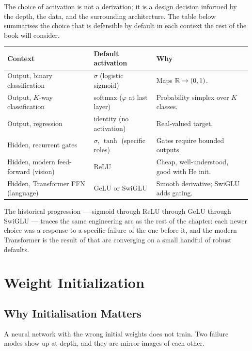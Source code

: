 The choice of activation is not a derivation; it is a design
decision informed by the depth, the data, and the surrounding
architecture. The table below summarises the choice that is
defensible by default in each context the rest of the book will
consider.

\begin{center}
\begin{tabular}{|l|l|l|}
\hline
\textbf{Context} & \textbf{Default activation} & \textbf{Why} \\
\hline
Output, binary classification        & $\sigma$ (logistic sigmoid) & Maps $\mathbb{R} \to (0, 1)$. \\
Output, $K$-way classification        & softmax ($\varphi$ at last layer)  & Probability simplex over $K$ classes. \\
Output, regression                    & identity (no activation)    & Real-valued target. \\
Hidden, recurrent gates              & $\sigma$, $\tanh$ (specific roles) & Gates require bounded outputs. \\
Hidden, modern feed-forward (vision) & ReLU                        & Cheap, well-understood, good with He init. \\
Hidden, Transformer FFN (language)   & GeLU or SwiGLU               & Smooth derivative; SwiGLU adds gating. \\
\hline
\end{tabular}
\end{center}

The historical progression --- sigmoid through ReLU through GeLU
through SwiGLU --- traces the same engineering arc as the rest
of the chapter: each newer choice was a response to a specific
failure of the one before it, and the modern Transformer is the
result of that arc converging on a small handful of robust
defaults.


\section{Weight Initialization}
\label{sec:nn-init}

\subsection{Why Initialisation Matters}

A neural network with the wrong initial weights does not train.
Two failure modes show up at depth, and they are mirror images of
each other.

